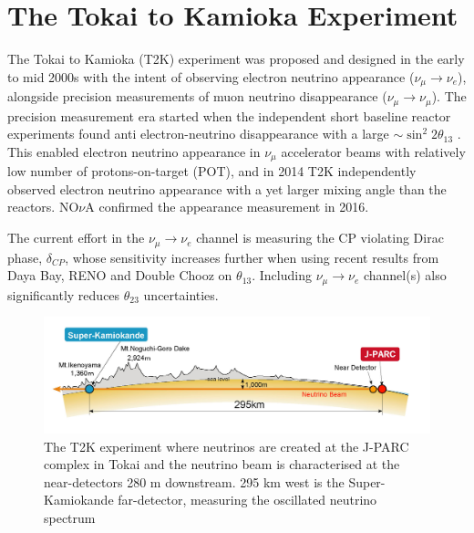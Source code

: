 \chapter{The Tokai to Kamioka Experiment}
\label{chap:detectors}
The Tokai to Kamioka (T2K) experiment was proposed and designed in the early to mid 2000s with the intent of observing electron neutrino appearance ($\nu_\mu \rightarrow \nu_e$), alongside precision measurements of muon neutrino disappearance ($\nu_\mu \rightarrow \nu_\mu$)\cite{t2k_loi,t2k_prop}. The precision measurement era started when the independent short baseline reactor experiments found anti electron-neutrino disappearance with a large $\sim \sin^2 2\theta_{13}$ \cite{daya_bay_disc,reno_disc,chooz_disc}. This enabled electron neutrino appearance in $\nu_\mu$ accelerator beams with relatively low number of protons-on-target (POT), and in 2014 T2K independently observed electron neutrino appearance\cite{t2k_disc} with a yet larger mixing angle than the reactors. NO$\nu$A confirmed\cite{nova_disc} the appearance measurement in 2016.

The current effort in the $\nu_\mu \rightarrow \nu_e$ channel is measuring the CP violating Dirac phase, $\delta_{CP}$, whose sensitivity increases further when using recent results from Daya Bay\cite{daya_bay}, RENO\cite{reno} and Double Chooz\cite{double_chooz} on $\theta_{13}$. Including $\nu_\mu \rightarrow \nu_e$ channel(s) also significantly reduces $\theta_{23}$ uncertainties\cite{nova_neutrino2018}.
\begin{figure}[h]
	\includegraphics[width=1.0\textwidth, trim={0mm 0mm 0mm 0mm}, clip,page=1]{figures/det_chap/view/t2k_overview}
	\caption{The T2K experiment where neutrinos are created at the J-PARC complex in Tokai and the neutrino beam is characterised at the near-detectors 280 m downstream. 295 km west is the Super-Kamiokande far-detector, measuring the oscillated neutrino spectrum}
	\label{fig:t2k_overview}
\end{figure}

